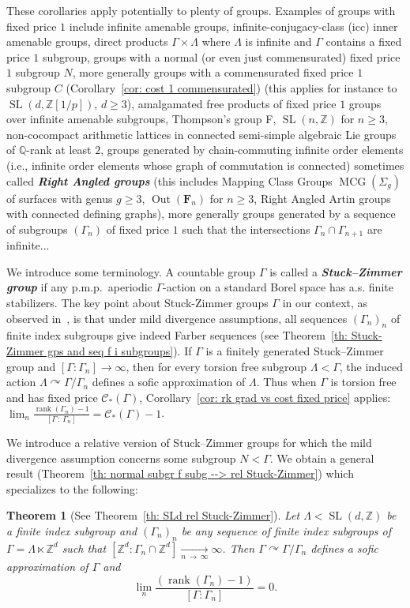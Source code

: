 \documentclass[10pt]{amsart}
\newtheorem{theo}[cdrthm]{Theorem}
\theoremstyle{definition}
\newcommand{\defin}[1]{\textbf{\emph{#1}}}
\newcommand{\Zmath}{\mathbb{Z}}
\newcommand{\Qmath}{\mathbb{Q}}
\newcommand{\FF}{\mathbf{F}}
\newcommand{\acting}{\curvearrowright}
\newcommand{\vraicost}{\mathscr{C}}
\DeclareMathOperator{\rank}{rank}
\DeclareMathOperator{\SL}{SL}
\DeclareMathOperator{\MCG}{MCG}
\DeclareMathOperator{\Out}{Out}
\newcommand{\pmp}{p.m.p.\ }
\begin{document}
These corollaries apply potentially to plenty of groups. Examples of groups with fixed price $1$ include infinite amenable groups, infinite-conjugacy-class (icc) inner amenable groups, direct products $\Gamma\times \Lambda$ where $\Lambda$ is infinite and $\Gamma$ contains a fixed price $1$ subgroup, groups with a normal (or even just commensurated) fixed price $1$ subgroup $N$, more generally groups with a commensurated fixed price $1$ subgroup $C$ (Corollary~\ref{cor: cost 1 commensurated}) (this applies for instance to $\SL(d, \Zmath[1/p])$, $d\geq 3$), amalgamated free products of fixed price $1$ groups over infinite amenable subgroups, Thompson’s group F, $\SL(n,\Zmath)$ for $n\geq 3$, non-cocompact arithmetic lattices in connected semi-simple algebraic Lie groups of $\Qmath$-rank at least $2$, groups generated by chain-commuting infinite order elements (i.e., infinite order elements whose graph of commutation is connected) sometimes called
\defin{Right Angled groups} (this includes Mapping Class Groups $\MCG(\Sigma_g)$ of surfaces with genus $g\geq 3$, $\Out(\FF_n)$ for $n\geq 3$, Right Angled Artin groups with connected defining graphs), more generally groups generated by a sequence of subgroups $(\Gamma_n)$ of fixed price $1$ such that the intersections $\Gamma_{n}\cap \Gamma_{n+1}$ are infinite...


We introduce some terminology. A countable group $\Gamma$ is called a
\defin{Stuck--Zimmer group} if any \pmp aperiodic $\Gamma$-action on a standard Borel space has a.s. finite stabilizers. The key point about Stuck-Zimmer groups $\Gamma$ in our context, as observed in~\cite{7s-2017}, is that under mild divergence assumptions, all sequences $(\Gamma_n)_n$ of finite index subgroups give indeed Farber sequences (see Theorem~\ref{th: Stuck-Zimmer gps and seq f i subgroups}). If $\Gamma$ is a finitely generated Stuck--Zimmer group and $[\Gamma:\Gamma_n]\to \infty$, then for every torsion free subgroup $\Lambda<\Gamma$, the induced action $\Lambda\acting \Gamma/\Gamma_n$ defines a sofic approximation of $\Lambda$. Thus when $\Gamma$ is torsion free and has fixed price $\vraicost_*(\Gamma)$, Corollary~\ref{cor: rk grad vs cost fixed price} applies: $\lim_{n}\tfrac{ \rank (\Gamma_n)-1}{ [\Gamma\,:\,\Gamma_n]}=\vraicost_*(\Gamma)-1$.



We introduce a relative version of Stuck--Zimmer groups for which the mild divergence assumption concerns some subgroup $N<\Gamma$. We obtain a general result (Theorem~\ref{th: normal subgr f subg --> rel Stuck-Zimmer}) which specializes to the following:
\begin{theo}[See Theorem~\ref{th: SLd rel Stuck-Zimmer}]\label{th: intro SLd rel Stuck-Zimmer}
Let $\Lambda<\SL(d,\Zmath)$ be a finite index subgroup and $(\Gamma_n)_n$ be any sequence of finite index subgroups of $\Gamma=\Lambda\ltimes \Zmath^d$ such that $[\Zmath^d:\Gamma_n\cap \Zmath^d]\underset{n\,\to\,\infty}{\longrightarrow}\infty$. Then $\Gamma\acting \Gamma/\Gamma_n$ defines a sofic approximation of $\Gamma$ and
\begin{equation}
\lim_{n}
\frac{\left(\rank (\Gamma_n)-1\right)}{ [\Gamma:\Gamma_n]}=0.
\end{equation}
\end{theo}
\end{document}
